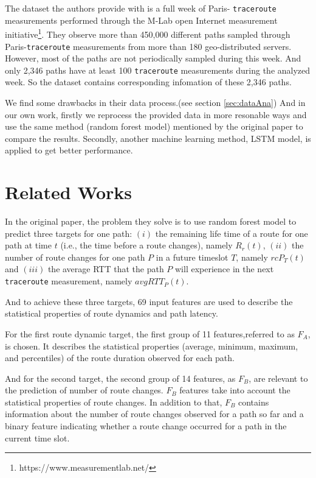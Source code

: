 \documentclass[sigconf]{acmart}
\begin{document}
	The dataset the authors provide with is a full week of Paris- \texttt{traceroute} measurements performed through the M-Lab open
	Internet measurement initiative\footnote{https://www.measurementlab.net/}. They observe more than 450,000 different paths sampled through Paris-\texttt{traceroute} measurements from more than 180 geo-distributed servers. However, most of the paths are not periodically sampled during this week. And only 2,346 paths have at least 100 \texttt{traceroute} measurements during the analyzed week. So the dataset contains corresponding infomation of these 2,346 paths.
	
	We find some drawbacks in their data process.(see section \ref{sec:dataAna}) And in our own work, firstly we reprocess the provided data in more resonable ways and use the same method (random forest model) mentioned by the original paper\cite{oripaper} to compare the results. Secondly, another machine learning method, LSTM model, is applied to get better performance.
	
	\section{Related Works}
	In the original paper\cite{oripaper}, the problem they solve is to use random forest model to predict three targets for one path: $(i)$ the remaining life time of a route for one path at time $t$ (i.e., the time before a route changes), namely $R_r(t)$, $(ii)$ the number of route changes for one path $P$ in a future timeslot $T$, namely $rcP_T(t)$  and $(iii)$ the average RTT that the path $P$ will experience in the next \texttt{traceroute} measurement, namely $avgRTT_P(t)$.
	
	And to achieve these three targets, 69 input features are used to describe the statistical properties of route dynamics and path latency.
	
	For the first route dynamic target, the first group of 11 features,referred to as $F_A$, is chosen. It describes the statistical properties (average, minimum, maximum, and percentiles) of the route duration observed for each path.
	
	And for the second target, the second group of 14 features, as $F_B$, are relevant to the prediction of number of route changes. $F_B$ features take into account the statistical properties of route changes. In addition to that, $F_B$ contains information about the number of route changes observed for a path so far and a binary feature indicating whether a route change occurred for a path in the current time slot. 
	
\end{document}
